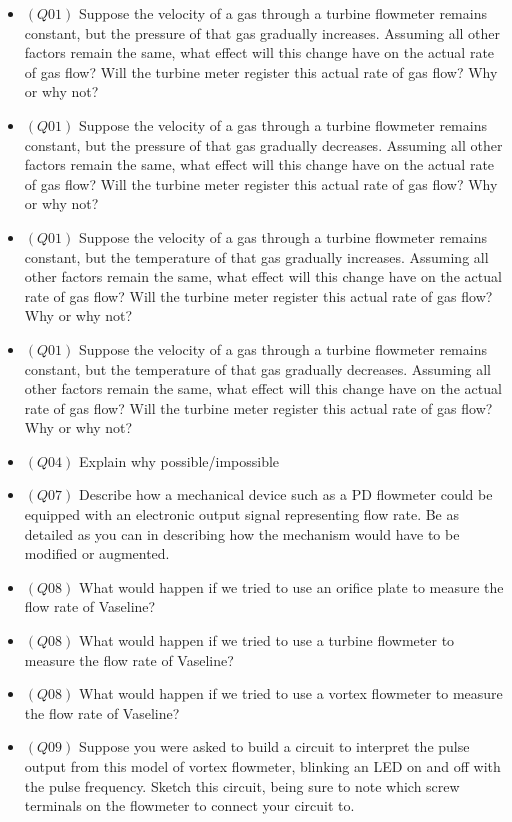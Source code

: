\begin{itemize}
\begin{itemize}
\item{$(Q01)$} Suppose the velocity of a gas through a turbine flowmeter remains constant, but the pressure of that gas gradually increases.  Assuming all other factors remain the same, what effect will this change have on the actual rate of gas flow?  Will the turbine meter register this actual rate of gas flow?  Why or why not?
\item{$(Q01)$} Suppose the velocity of a gas through a turbine flowmeter remains constant, but the pressure of that gas gradually decreases.  Assuming all other factors remain the same, what effect will this change have on the actual rate of gas flow?  Will the turbine meter register this actual rate of gas flow?  Why or why not?
\item{$(Q01)$} Suppose the velocity of a gas through a turbine flowmeter remains constant, but the temperature of that gas gradually increases.  Assuming all other factors remain the same, what effect will this change have on the actual rate of gas flow?  Will the turbine meter register this actual rate of gas flow?  Why or why not?
\item{$(Q01)$} Suppose the velocity of a gas through a turbine flowmeter remains constant, but the temperature of that gas gradually decreases.  Assuming all other factors remain the same, what effect will this change have on the actual rate of gas flow?  Will the turbine meter register this actual rate of gas flow?  Why or why not?
\item{$(Q04)$} Explain why possible/impossible
\item{$(Q07)$} Describe how a mechanical device such as a PD flowmeter could be equipped with an electronic output signal representing flow rate.  Be as detailed as you can in describing how the mechanism would have to be modified or augmented.
\item{$(Q08)$} What would happen if we tried to use an orifice plate to measure the flow rate of Vaseline?
\item{$(Q08)$} What would happen if we tried to use a turbine flowmeter to measure the flow rate of Vaseline?
\item{$(Q08)$} What would happen if we tried to use a vortex flowmeter to measure the flow rate of Vaseline?
\item{$(Q09)$} Suppose you were asked to build a circuit to interpret the pulse output from this model of vortex flowmeter, blinking an LED on and off with the pulse frequency.  Sketch this circuit, being sure to note which screw terminals on the flowmeter to connect your circuit to.
\medskip



\end{itemize}
\end{itemize}
